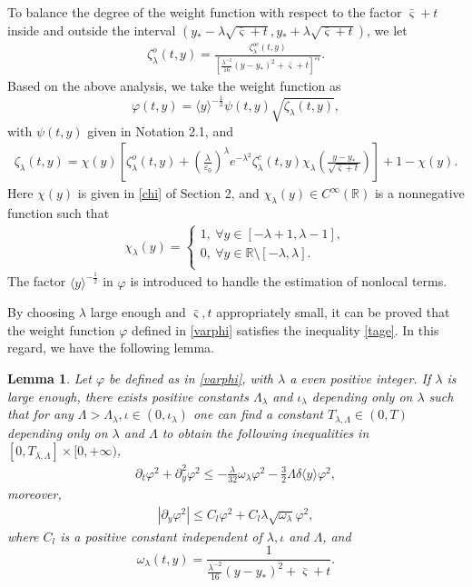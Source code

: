 \documentclass{amsart}
\numberwithin{equation}{section}
\newtheorem{lemma}{Lemma}[section]
\newcommand\y{{{\langle y \rangle}}}
\begin{document}
To balance the degree of the weight function with respect to the factor $\bar{\varsigma}+t$ inside and outside the interval $(y_{*}-\lambda\sqrt{\bar{\varsigma}+t},y_{*}+\lambda\sqrt{\bar{\varsigma}+t})$, we let
\begin{align}\label{zetao}
\zeta_{\lambda}^{o}(t,y)=\frac{\zeta_{\lambda}^{oc}(t,y)}{[\frac{\lambda^{-2}}{16}(y-y_{*})^{2}+\bar{\varsigma}+t]^{\varepsilon_{0}}}.
\end{align}
Based on the above analysis, we take the weight function as
\begin{equation}\label{varphi}
\varphi(t,y)=\y^{-\frac{1}{2}}\psi(t,y)\sqrt{\zeta_{\lambda}(t,y)},
\end{equation}
with $\psi(t,y)$ given in Notation 2.1, and
\begin{align*}
\zeta_{\lambda}(t,y)
=\chi(y)\left[\zeta_{\lambda}^{o}(t,y)+\left(\frac{\lambda}{\varepsilon_{0}}\right)^{\lambda}e^{-\lambda^{2}}\zeta_{\lambda}^{c}(t,y)\chi_{\lambda}\left(\frac{y-y_{*}}{\sqrt{\bar{\varsigma}+t}}\right)\right]
 +1-\chi(y).
\end{align*}
Here $\chi(y)$ is given in \eqref{chi} of Section 2, and $\chi_{\lambda}(y)\in C^{\infty}(\mathbb{R})$ is a nonnegative function such that
\begin{align*}
\chi_{\lambda}(y)=
\begin{cases}
1,~\forall y\in[-\lambda+1,\lambda-1],\\
0,~\forall y\in\mathbb{R}\setminus[-\lambda,\lambda].\\
\end{cases}
\end{align*}
The factor $\y^{-\frac{1}{2}}$ in $\varphi$ is introduced to handle the estimation of nonlocal terms.


By choosing $\lambda$ large enough and $\bar{\varsigma}, t$ appropriately small, it can be proved that the weight function $\varphi$ defined in \eqref{varphi} satisfies the inequality \eqref{tage}. In this regard, we have the following lemma.


\begin{lemma}\label{weighte}
Let $\varphi$ be defined as in \eqref{varphi}, with $\lambda$ a even positive integer. If $\lambda$ is large enough, there exists positive constants $\Lambda_{\lambda}$ and $\iota_{\lambda}$ depending only on $\lambda$ such that for any
$\Lambda>\Lambda_{\lambda}, \iota\in(0,\iota_{\lambda})$ one can find a constant $T_{\lambda,\Lambda}\in(0,T)$ depending only on $\lambda$ and $\Lambda$ to obtain the following inequalities in $[0,T_{\lambda,\Lambda}]\times[0,+\infty)$,
\begin{align}\label{We}
\partial_{t}\varphi^{2}+\partial_{y}^{2}\varphi^{2}
\leq -\frac{\lambda}{32}\omega_{\lambda}\varphi^{2}
     -\frac{3}{2}\Lambda\delta\y\varphi^{2},
\end{align}
moreover,
\begin{align}\label{varphiy}
|\partial_{y}\varphi^{2}|
\leq C_{l}\varphi^{2}+C_{l}\lambda\sqrt{\omega_{\lambda}}\varphi^{2},
\end{align}
where $C_{l}$ is a positive constant independent of $\lambda,\iota$ and $\Lambda$, and
$$\omega_{\lambda}(t,y)=\frac{1}{\frac{\lambda^{-2}}{16}(y-y_{*})^{2}+\bar{\varsigma}+t}.$$
\end{lemma}
\end{document}
